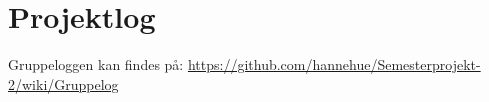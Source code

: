 \section{Projektlog}
Gruppeloggen kan findes på: \href{https://github.com/hannehue/Semesterprojekt-2/wiki/Gruppelog}{https://github.com/hannehue/Semesterprojekt-2/wiki/Gruppelog}